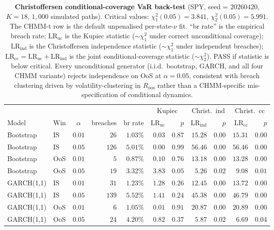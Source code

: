 \begin{table}[!ht]
\centering
\small
\caption{\textbf{Christoffersen conditional-coverage VaR back-test} (SPY, seed = $20260420$, $K = 18$, $1{,}000$ simulated paths). Critical values: $\chi^2_1(0.05) = 3.841$, $\chi^2_2(0.05) = 5.991$. The CHMM-t row is the default unpenalised per-state-$\nu$ fit. ``br rate'' is the empirical breach rate; $\text{LR}_{\text{uc}}$ is the Kupiec statistic ($\sim\chi^2_1$ under correct unconditional coverage); $\text{LR}_{\text{ind}}$ is the Christoffersen independence statistic ($\sim\chi^2_1$ under independent breaches); $\text{LR}_{\text{cc}} = \text{LR}_{\text{uc}} + \text{LR}_{\text{ind}}$ is the joint conditional-coverage statistic ($\sim\chi^2_2$). PASS if statistic is below critical. Every unconditional generator (i.i.d.\ bootstrap, GARCH, and all four CHMM variants) rejects independence on OoS at $\alpha = 0.05$, consistent with breach clustering driven by volatility-clustering in $R_{\text{oos}}$ rather than a CHMM-specific mis-specification of conditional dynamics.}
\label{tab:christoffersen_var}
\begin{tabular}{l l c r r r r r r r r}
\toprule
& & & & & \multicolumn{2}{c}{Kupiec} & \multicolumn{2}{c}{Christ.\ ind} & \multicolumn{2}{c}{Christ.\ cc} \\
\cmidrule(lr){6-7}\cmidrule(lr){8-9}\cmidrule(lr){10-11}
Model & Win & $\alpha$ & breaches & br rate & $\text{LR}_{\text{uc}}$ & $p$ & $\text{LR}_{\text{ind}}$ & $p$ & $\text{LR}_{\text{cc}}$ & $p$ \\
\midrule
Bootstrap & IS  & $0.01$ & $26$  & $1.03\%$ & $0.03$ & $0.87$ & $15.28$ & $0.00$ & $15.31$ & $0.00$ \\
Bootstrap & IS  & $0.05$ & $126$ & $5.01\%$ & $0.00$ & $0.99$ & $56.46$ & $0.00$ & $56.46$ & $0.00$ \\
Bootstrap & OoS & $0.01$ & $5$   & $0.87\%$ & $0.10$ & $0.76$ & $13.18$ & $0.00$ & $13.28$ & $0.00$ \\
Bootstrap & OoS & $0.05$ & $19$  & $3.32\%$ & $3.83$ & $0.05$ & $5.26$  & $0.02$ & $9.08$  & $0.01$ \\
\midrule
GARCH(1,1) & IS  & $0.01$ & $31$  & $1.23\%$ & $1.28$ & $0.26$ & $12.45$ & $0.00$ & $13.72$ & $0.00$ \\
GARCH(1,1) & IS  & $0.05$ & $139$ & $5.52\%$ & $1.41$ & $0.24$ & $45.38$ & $0.00$ & $46.79$ & $0.00$ \\
GARCH(1,1) & OoS & $0.01$ & $6$   & $1.05\%$ & $0.01$ & $0.91$ & $20.87$ & $0.00$ & $20.89$ & $0.00$ \\
GARCH(1,1) & OoS & $0.05$ & $24$  & $4.20\%$ & $0.82$ & $0.37$ & $5.87$  & $0.02$ & $6.69$  & $0.04$ \\

\end{tabular}
\end{table}
